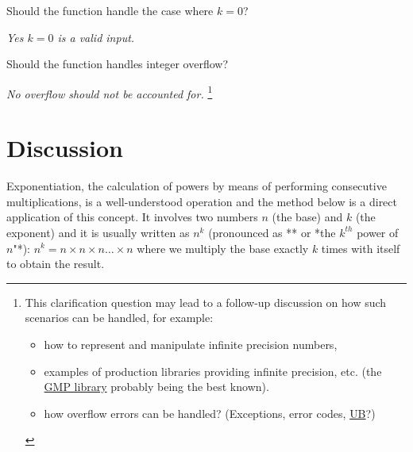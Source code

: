 \begin{QandA}
    \begin{questionitem} \begin{question} Should the function handle the case where $k=0$?  \end{question}      
    \begin{answered}
        \textit{Yes $k=0$ is a valid input.}
    \end{answered} \end{questionitem}
    
    \begin{questionitem} \begin{question} Should the function handles integer overflow?  \end{question}      
    \begin{answered}
        \textit{No overflow should not be accounted for. }\footnote{
            This clarification question may lead to a follow-up discussion on how such scenarios can be handled, for example: 
            \begin{itemize}
                \item how to represent and manipulate infinite precision numbers,
                \item examples of production libraries providing infinite precision, etc. (the \href{https://gmplib.org/}{GMP library}\cite{cit::web::gmplibrary} probably being the best known).
                \item how overflow errors can be handled? (Exceptions, error codes, \href{https://en.cppreference.com/w/cpp/language/ub}{UB}\cite{cit::std::ub}?)
            \end{itemize}
            }
    \end{answered} \end{questionitem}
        
\end{QandA}

\section{Discussion}
\label{exponentiation:sec:discussion}

Exponentiation, the calculation of powers by means of performing consecutive multiplications, is a well-understood operation and the method below is a direct application of this concept.  
It involves two numbers $n$ (the base) and $k$ (the exponent) and it is usually written as $n^k$ (pronounced as ** or *the ${k^{th}}$ power of $n$"*):
$n^k = n \times n \times n \ldots  \times n$ where we multiply the base exactly $k$ times with itself
to obtain the result. 

